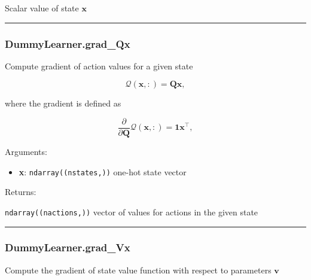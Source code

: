 Scalar value of state \(\mathbf x\)

\begin{center}\rule{0.5\linewidth}{\linethickness}\end{center}

\subsubsection{DummyLearner.grad\_Qx}\label{dummylearner.grad_qx}

\begin{Shaded}
\begin{Highlighting}[]
\end{Highlighting}
\end{Shaded}

Compute gradient of action values for a given state

\[
\mathcal Q(\mathbf x, :) = \mathbf Q \mathbf x,
\]

where the gradient is defined as

\[
\frac{\partial}{\partial \mathbf Q} \mathcal Q(\mathbf x, :) = \mathbf 1 \mathbf x^\top,
\]

Arguments:

\begin{itemize}
\tightlist
\item
  \textbf{x}: \texttt{ndarray((nstates,))} one-hot state vector
\end{itemize}

Returns:

\texttt{ndarray((nactions,))} vector of values for actions in the given
state

\begin{center}\rule{0.5\linewidth}{\linethickness}\end{center}

\subsubsection{DummyLearner.grad\_Vx}\label{dummylearner.grad_vx}

\begin{Shaded}
\begin{Highlighting}[]
\end{Highlighting}
\end{Shaded}

Compute the gradient of state value function with respect to parameters
\(\mathbf v\)

